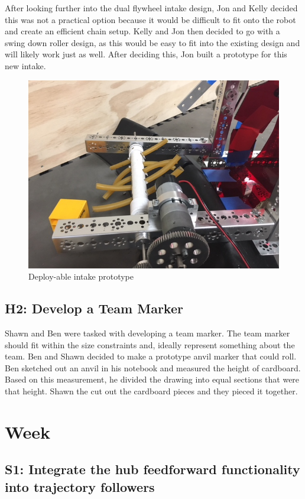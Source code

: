 \documentclass{article}
\begin{document}
After looking further into the dual flywheel intake design, Jon and Kelly decided this was not a practical option because it would be difficult to fit onto the robot and create an efficient chain setup. Kelly and Jon then decided to go with a swing down roller design, as this would be easy to fit into the existing design and will likely work just as well. After deciding this, Jon built a prototype for this new intake. 

\begin{figure}
    \centering
    \includegraphics[width=.6\textwidth]{03_09-17/images/IMG_0262.JPG}
    \caption{Deploy-able intake prototype}
    \label{fig:my_label}
\end{figure}

\subsection{H2: Develop a Team Marker}

Shawn and Ben were tasked with developing a team marker. The team marker should fit within the size constraints and, ideally represent something about the team. Ben and Shawn decided to make a prototype anvil marker that could roll. Ben sketched out an anvil in his notebook and measured the height of cardboard. Based on this measurement, he divided the drawing into equal sections that were that height. Shawn the cut out the cardboard pieces and they pieced it together.\clearpage \newpage \section{Week \thesection} 
\subsection{S1: Integrate the hub feedforward functionality into trajectory followers}
\end{document}
